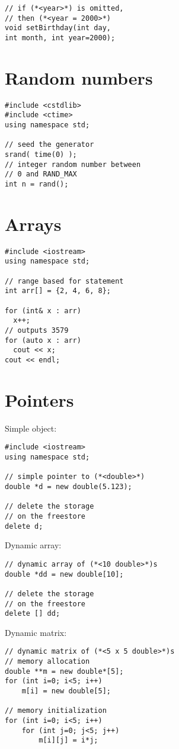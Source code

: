 \documentclass[10pt]{article}
\begin{document}
\begin{multicols*}{3}
\begin{lstlisting}
// if (*<year>*) is omitted, 
// then (*<year = 2000>*)
void setBirthday(int day,
int month, int year=2000);
\end{lstlisting}
%
%
\section*{Random numbers}
\small
\lstset {language=C++}
\begin{lstlisting}
#include <cstdlib>
#include <ctime>
using namespace std;

// seed the generator
srand( time(0) );
// integer random number between
// 0 and RAND_MAX
int n = rand();
\end{lstlisting}
%
%
\section*{Arrays}
\small
\lstset {language=C++}
\begin{lstlisting}
#include <iostream>
using namespace std;

// range based for statement
int arr[] = {2, 4, 6, 8};

for (int& x : arr)
  x++;
// outputs 3579
for (auto x : arr)
  cout << x;
cout << endl;
\end{lstlisting}
%
%
\section*{Pointers}
\small
Simple object:
\lstset {language=C++}
\begin{lstlisting}
#include <iostream>
using namespace std;

// simple pointer to (*<double>*)
double *d = new double(5.123);

// delete the storage
// on the freestore
delete d;
\end{lstlisting}
Dynamic array:
\lstset {language=C++}
\begin{lstlisting}
// dynamic array of (*<10 double>*)s
double *dd = new double[10];

// delete the storage
// on the freestore
delete [] dd;
\end{lstlisting}
Dynamic matrix:
\lstset {language=C++}
\begin{lstlisting}
// dynamic matrix of (*<5 x 5 double>*)s
// memory allocation
double **m = new double*[5];
for (int i=0; i<5; i++)
    m[i] = new double[5];

// memory initialization    
for (int i=0; i<5; i++)
    for (int j=0; j<5; j++)
        m[i][j] = i*j;


\end{lstlisting}
\end{multicols*}
\end{document}
